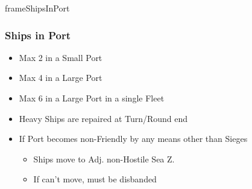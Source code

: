 \documentclass[10pt]{article}
\newlength{\fhShipsInPort} \setlength\fhShipsInPort{10\baselineskip}
\begin{document}
\begin{dynamiccontents*}{frameShipsInPort}\begin{eubox}{\fhShipsInPort}
	\subsubsection*{Ships in Port }
	\begin{itemize}
		\item Max 2 in a Small Port
		\item Max 4 in a Large Port
		\item Max 6 in a Large Port in a single Fleet
		\item Heavy Ships are repaired at Turn/Round end
		\item If Port becomes non-Friendly by any means other than Sieges
		\begin{itemize}
			\item Ships move to Adj. non-Hostile Sea Z.
			\item If can't move, must be disbanded 
		\end{itemize}
	\end{itemize}
\end{eubox}\end{dynamiccontents*}
\end{document}
